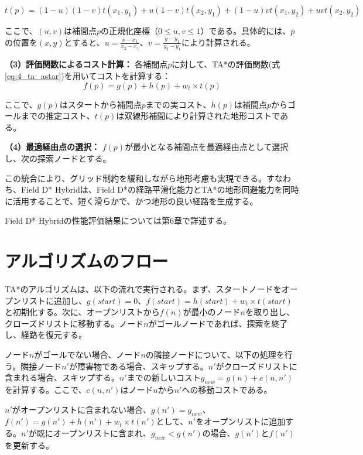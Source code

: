 \begin{equation}
t(p) = (1-u)(1-v)t(x_1,y_1) + u(1-v)t(x_2,y_1) + (1-u)v t(x_1,y_2) + uv t(x_2,y_2)
\end{equation}

ここで、$(u,v)$は補間点$p$の正規化座標（$0 \leq u,v \leq 1$）である。具体的には、$p$の位置を$(x,y)$とすると、$u = \frac{x - x_1}{x_2 - x_1}$、$v = \frac{y - y_1}{y_2 - y_1}$により計算される。

\textbf{（3）評価関数によるコスト計算：}
各補間点$p$に対して、TA*の評価関数(式\ref{eq:4_ta_astar})を用いてコストを計算する：
\begin{equation}
f(p) = g(p) + h(p) + w_t \times t(p)
\end{equation}

ここで、$g(p)$はスタートから補間点$p$までの実コスト、$h(p)$は補間点$p$からゴールまでの推定コスト、$t(p)$は双線形補間により計算された地形コストである。

\textbf{（4）最適経由点の選択：}
$f(p)$が最小となる補間点を最適経由点として選択し、次の探索ノードとする。

この統合により、グリッド制約を緩和しながら地形考慮も実現できる。すなわち、Field D* Hybridは、Field D*の経路平滑化能力とTA*の地形回避能力を同時に活用することで、短く滑らかで、かつ地形の良い経路を生成する。

Field D* Hybridの性能評価結果については第6章で詳述する。

\section{アルゴリズムのフロー}

TA*のアルゴリズムは、以下の流れで実行される。まず、スタートノードをオープンリストに追加し、$g(start) = 0$、$f(start) = h(start) + w_t \times t(start)$と初期化する。次に、オープンリストから$f(n)$が最小のノード$n$を取り出し、クローズドリストに移動する。ノード$n$がゴールノードであれば、探索を終了し、経路を復元する。

ノード$n$がゴールでない場合、ノード$n$の隣接ノードについて、以下の処理を行う。隣接ノード$n'$が障害物である場合、スキップする。$n'$がクローズドリストに含まれる場合、スキップする。$n'$までの新しいコスト$g_{new} = g(n) + c(n, n')$を計算する。ここで、$c(n, n')$はノード$n$から$n'$への移動コストである。

$n'$がオープンリストに含まれない場合、$g(n') = g_{new}$、$f(n') = g(n') + h(n') + w_t \times t(n')$として、$n'$をオープンリストに追加する。$n'$が既にオープンリストに含まれ、$g_{new} < g(n')$の場合、$g(n')$と$f(n')$を更新する。

